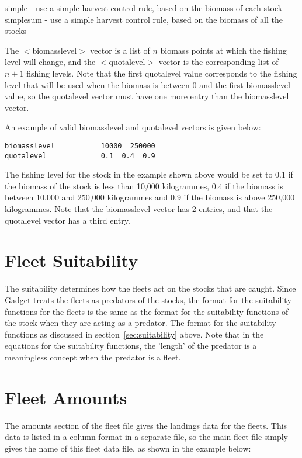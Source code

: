 \documentclass[10pt,twoside]{book}
\begin{document}
\bigskip
simple - use a simple harvest control rule, based on the biomass of each stock\newline
simplesum - use a simple harvest control rule, based on the biomass of all the stocks

\bigskip
The $<$biomasslevel$>$ vector is a list of $n$ biomass points at which the fishing level will change, and the $<$quotalevel$>$ vector is the corresponding list of $n+1$ fishing levels.  Note that the first quotalevel value corresponds to the fishing level that will be used when the biomass is between 0 and the first biomasslevel value, so the quotalevel vector must have one more entry than the biomasslevel vector.

\bigskip
An example of valid biomasslevel and quotalevel vectors is given below:

{\small\begin{verbatim}
biomasslevel           10000  250000
quotalevel             0.1  0.4  0.9
\end{verbatim}}

The fishing level for the stock in the example shown above would be set to 0.1 if the biomass of the stock is less than 10,000 kilogrammes, 0.4 if the biomass is between 10,000 and 250,000 kilogrammes and 0.9 if the biomass is above 250,000 kilogrammes.  Note that the biomasslevel vector has 2 entries, and that the quotalevel vector has a third entry.

\section{Fleet Suitability}\label{sec:fleetsuit}
The suitability determines how the fleets act on the stocks that are caught.  Since Gadget treats the fleets as predators of the stocks, the format for the suitability functions for the fleets is the same as the format for the suitability functions of the stock when they are acting as a predator.  The format for the suitability functions as discussed in section~\ref{sec:suitability} above.  Note that in the equations for the suitability functions, the 'length' of the predator is a meaningless concept when the predator is a fleet.

\section{Fleet Amounts}\label{sec:fleetamount}
The amounts section of the fleet file gives the landings data for the fleets.  This data is listed in a column format in a separate file, so the main fleet file simply gives the name of this fleet data file, as shown in the example below:
\end{document}
